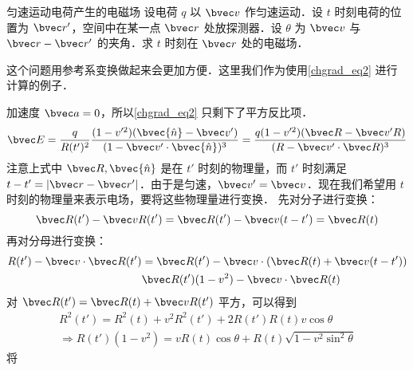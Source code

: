 \begin{example}{匀速运动电荷产生的电磁场}
设电荷 $q$ 以 $\bvec v$ 作匀速运动．设 $t$ 时刻电荷的位置为 $\bvec r'$，空间中在某一点 $\bvec r$ 处放探测器．设 $\theta$ 为 $\bvec v$ 与 $\bvec r-\bvec r'$ 的夹角．求 $t$ 时刻在 $\bvec r$ 处的电磁场．

这个问题用参考系变换做起来会更加方便．这里我们作为使用\autoref{chgrad_eq2} 进行计算的例子．

加速度 $\bvec a=0$，所以\autoref{chgrad_eq2} 只剩下了平方反比项．
\begin{equation}
\bvec E=\frac{q}{R(t')^2}\frac{(1-v'^2)(\bvec{\hat n}-\bvec v')}{(1-\bvec v'\cdot \bvec{\hat n})^3}=\frac{q(1-v'^2)(\bvec R-\bvec v'R)}{(R-\bvec v'\cdot \bvec R)^3}
\end{equation}
注意上式中 $\bvec R,\bvec{\hat n}$ 是在 $t'$ 时刻的物理量，而 $t'$ 时刻满足 $t-t'=|\bvec r-\bvec r'|$．由于是匀速，$\bvec v'=\bvec v$．现在我们希望用 $t$ 时刻的物理量来表示电场，要将这些物理量进行变换．
先对分子进行变换：
\begin{equation}\label{chgrad_eq4}
\bvec R(t')-\bvec vR(t')=\bvec R(t')-\bvec v(t-t')=\bvec R(t)
\end{equation}
再对分母进行变换：
\begin{equation}
\begin{aligned}
R(t')-\bvec v\cdot \bvec R(t')&=\bvec R(t')-\bvec v\cdot(\bvec R(t)+\bvec v(t-t'))\\
&\bvec R(t')(1-v^2)-\bvec v\cdot \bvec R(t)
\end{aligned}
\end{equation}
对 $\bvec R(t')=\bvec R(t)+\bvec vR(t')$ 平方，可以得到
\begin{equation}
\begin{aligned}
R^2(t')=R^2(t)+v^2R^2(t')+2R(t')R(t)v\cos \theta\\
\Rightarrow R(t')(1-v^2)=vR(t)\cos \theta+R(t)\sqrt{1-v^2\sin^2\theta}
\end{aligned}
\end{equation}
将
\end{example}